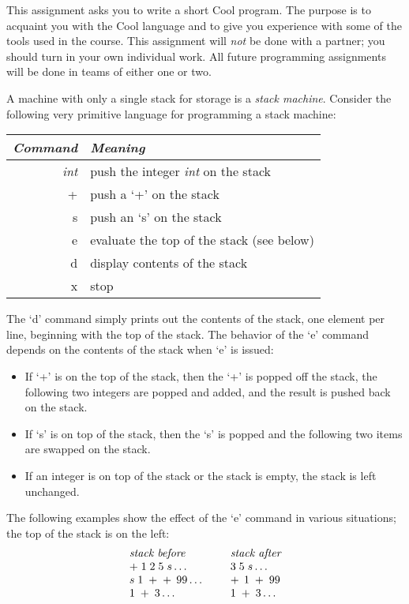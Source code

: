 \documentclass[11pt]{article}
\begin{document}

This assignment asks you to write a short Cool program.  The purpose is
to acquaint you with the Cool language and to give you experience with
some of the tools used in the course.  This assignment will {\em not} be
done with a partner; you should turn in your own individual work.  All
future programming assignments will be done in teams of either one or
two.

A machine with only a single stack for storage is a {\em stack machine}.
Consider the following very primitive language for programming  
a stack machine: \\
\begin{center}
\begin{tabular}{r|l}
{\em Command} & {\em Meaning} \\ \hline
{\em int}  & push the integer {\em int}  on the stack \\
+ & push a `+' on the stack \\
s & push an `s' on the stack \\
e & evaluate the top of the stack (see below) \\
d & display contents of the stack \\
x & stop
\end{tabular}
\end{center}

The `d' command simply prints out the contents of the stack, one element
per line, beginning with the top of the stack.  The behavior of the `e'
command depends on the contents of the stack when `e' is issued:
\begin{itemize}
\item If `+' is on the top of the stack, then the `+'
is popped off the stack, the following two integers are popped
and added, and the result is pushed back on the stack.

\item If `s' is on top of the stack, then the `s' is popped and
the following two items are swapped on the stack.

\item If an integer is on top of the stack or the stack is empty, the
stack is left unchanged.
\end{itemize}

The following examples show the effect of the `e' command in various
situations; the top of the stack is on the left:
\[
\begin{array}{lcl}
\mbox{\em stack before} & & \mbox{\em stack after} \\
+ \; 1 \; 2 \; 5 \; s \ldots & \;\; & 3 \; 5 \; s \ldots \\
s \; 1 \; + \; + \,\; 99 \ldots & & + \,\; 1\; + \; 99 \\
1 \; + \; 3 \ldots & & 1 \; + \; 3 \ldots \\
\end{array}
\]
\end{document}
